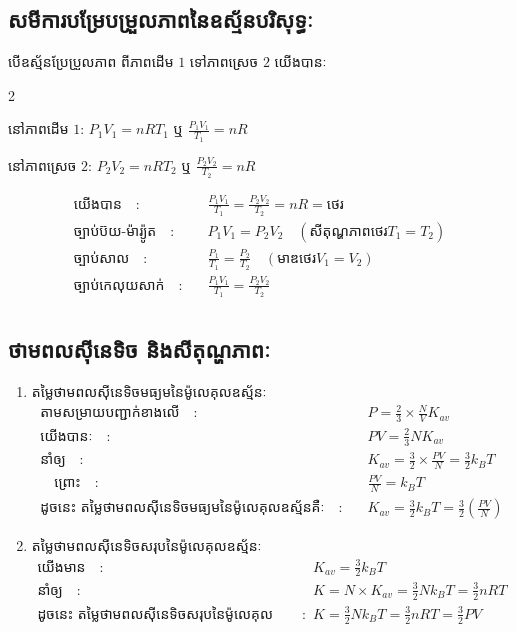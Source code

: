 		\subsection{សមីការបម្រែបម្រួលភាពនៃឧស្ម័នបរិសុទ្ធៈ} បើឧស្ម័នប្រែប្រួលភាព ពីភាពដើម $1$ ទៅភាពស្រេច $2$ យើងបានៈ
		\begin{itemize}
		\end{itemize}
		\begin{align*}
		\text{យើងបាន}\quad :&\quad \frac{P_1V_1}{T_1}=\frac{P_2V_2}{T_2}=nR=\text{ថេរ}\\
		\text{ច្បាប់ប៊យ-ម៉ារ្យ៉ូត}\quad :&\quad P_{1}V_{1}=P_{2}V_{2}\quad \left(\text{សីតុណ្ហភាពថេរ} T_{1}=T_{2}\right)\\
		\text{ច្បាប់សាល}\quad :&\quad \frac{P_1}{T_1}=\frac{P_2}{T_2}\quad \left(\text{មាឌថេរ} V_{1}=V_{2}\right)\\
		\text{ច្បាប់កេលុយសាក់}\quad :&\quad \frac{P_1V_1}{T_1}=\frac{P_2V_2}{T_2}\\
		\end{align*}
		\subsection{ថាមពលសុីនេទិច និងសីតុណ្ហភាពៈ}
		\begin{enumerate}[m]
			\item {\kml \color{magenta} តម្លៃថាមពលសុីនេទិចមធ្យមនៃម៉ូលេគុលឧស្ម័នៈ}
			\begin{align*}
			\text{តាមសម្រាយបញ្ជាក់ខាងលើ}\quad :&\quad P=\frac{2}{3}\times\frac{N}{V}K_{av}\quad\\ \text{យើងបានៈ}\quad :&\quad PV=\frac{2}{3}NK_{av}\\
			\text{នាំឲ្យ}\quad :&\quad K_{av}=\frac{3}{2}\times\frac{PV}{N}=\frac{3}{2}k_{B}T\\\quad\text{ព្រោះ}\quad :& \quad \frac{PV}{N}=k_{B}T\\
			\text{ដូចនេះ តម្លៃថាមពលសុីនេទិចមធ្យមនៃម៉ូលេគុលឧស្ម័នគឺៈ}\quad :& \quad K_{av}=\frac{3}{2}k_{B}T=\frac{3}{2}\left(\frac{PV}{N}\right)
			\end{align*}
			\item {\kml \color{magenta} តម្លៃថាមពលសុីនេទិចសរុបនៃម៉ូលេគុលឧស្ម័នៈ}
			\begin{align*}
			\text{យើងមាន}\quad :&\quad K_{av}=\frac{3}{2}k_{B}T\\
			\text{នាំឲ្យ}\quad :&\quad K=N\times K_{av}=\frac{3}{2}Nk_{B}T=\frac{3}{2}nRT\\
			\text{ដូចនេះ តម្លៃថាមពលសុីនេទិចសរុបនៃម៉ូលេគុលឧស្ម័នគឺៈ}\quad :& \quad K=\frac{3}{2}Nk_{B}T=\frac{3}{2}nRT=\frac{3}{2}PV
			\end{align*}
		\end{enumerate}
